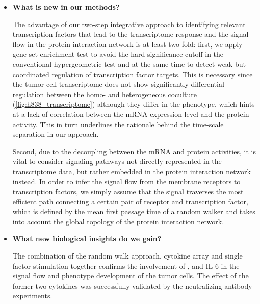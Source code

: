 \begin{itemize}
\item \textbf{What is new in our methods?}

The advantage of our two-step integrative approach to identifying 
relevant transcription factors that lead to the transcriptome response
and the signal flow in the protein interaction network 
is at least two-fold: first, we apply gene set enrichment test to avoid the hard 
significance cutoff in the conventional hypergeometric test and at the same time
to detect weak but coordinated regulation of transcription factor targets. This is 
necessary since the tumor cell transcriptome does not show significantly
differential regulation between the homo- and heterogeneous coculture 
(\ref{fig:h838_transcriptome}) although they differ in the phenotype, which 
hints at a lack of correlation between the mRNA expression level and the protein 
activity. This in turn underlines the rationale behind the time-scale separation
in our approach. 

Second, due to the decoupling between the mRNA and protein
activities, it is vital to consider signaling pathways not directly represented
in the transcriptome data, but rather embedded in the protein interaction network
instead. In order to infer the signal flow from the membrane receptors to 
transcription factors, we simply assume that the signal traverses the most efficient
path connecting a certain pair of receptor and transcription factor, which is 
defined by the mean first passage time of a random walker and takes into account
the global topology of the protein interaction network.

\item \textbf{What new  biological insights do we gain?}

The combination of the random walk approach, cytokine array and single factor
stimulation together confirms the involvement of \tnfa, 
\sdfonea and 
IL-6 in the
signal flow and phenotype development of the tumor cells. 
The effect of the former two cytokines was successfully 
validated by the 
neutralizing antibody experiments.


\end{itemize}
